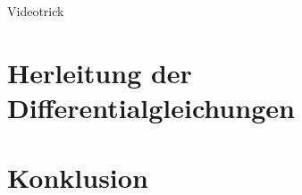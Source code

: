 \documentclass[xcolor=dvipsnames, aspectratio=169]{beamer}
\begin{document}
\begin{frame}[t]{Videotrick}
\begin{center}
\end{center}
\end{frame}

\section{Herleitung der Differentialgleichungen}
\section{Konklusion}
\end{document}
